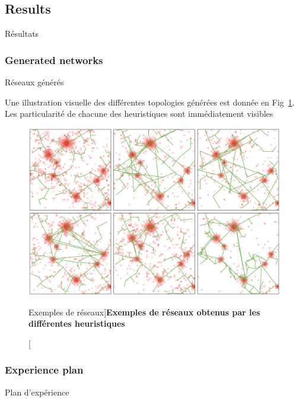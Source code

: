 \subsection{Results}{Résultats}


\subsubsection{Generated networks}{Réseaux générés}

Une illustration visuelle des différentes topologies générées est donnée en Fig~\ref{fig:networkgrowth:examples}. Les particularité de chacune des heuristiques sont immédiatement visibles




\begin{figure}
	\includegraphics[width=\linewidth]{Figures/Final/7-1-2-fig-networkgrowth-examples.jpg}
\caption[Network examples][Exemples de réseaux]{\label{fig:networkgrowth:examples}}{\textbf{Exemples de réseaux obtenus par les différentes heuristiques}\label{fig:networkgrowth:examples}}
\end{figure}




\subsubsection{Experience plan}{Plan d'expérience}



